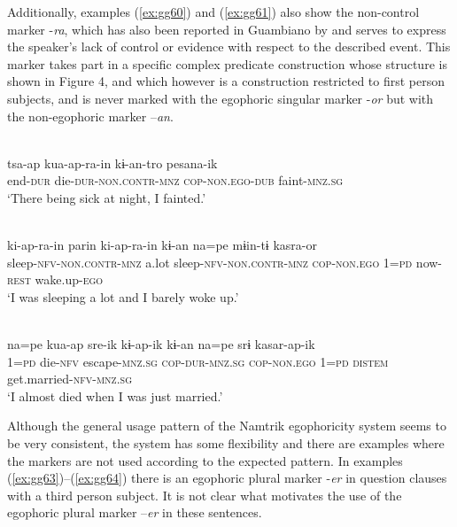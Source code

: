 \documentclass[output=paper]{langsci/langscibook}
\begin{document}
Additionally, examples (\ref{ex:gg60}) and (\ref{ex:gg61}) also show the non-control marker -\textit{ra}, which has also been reported in Guambiano by \citet[98--99]{Vasquez2017} and serves to express the speaker’s lack of control or evidence with respect to the described event. This marker takes part in a specific complex predicate construction whose structure is shown in Figure 4, %
and which however is a construction restricted to first person subjects, and is never marked with the egophoric singular marker -\textit{or} but with the non-egophoric marker –\textit{an}.


\ea \label{ex:gg60}
\\
	\gll tsa-ap	kua-ap-ra-in kɨ-an-tro	pesana-ik\\
	end-\textsc{dur} die-\textsc{dur-non.contr-mnz} \textsc{cop-non.ego-dub} faint-\textsc{mnz.sg}\\
	\glt ‘There being sick at night, I fainted.’  
\z

\ea \label{ex:gg61}
\\
	\gll ki-ap-ra-in	parin	ki-ap-ra-in	kɨ-an na=pe	mɨin-tɨ	kasra-or\\
	sleep-\textsc{nfv-non.contr-mnz} a.lot sleep-\textsc{nfv-non.contr-mnz} \textsc{cop-non.ego} 1=\textsc{pd} now-\textsc{rest} wake.up-\textsc{ego}\\
	\glt ‘‎‎I was sleeping a lot and I barely woke up.’ 
\z


\ea \label{ex:gg62}
\\
	\gll na=pe kua-ap sre-ik	kɨ-ap-ik kɨ-an na=pe srɨ kasar-ap-ik\\
	1=\textsc{pd}	 die-\textsc{nfv} escape-\textsc{mnz.sg} \textsc{cop-dur-mnz.sg} \textsc{cop-non.ego} 1=\textsc{pd} \textsc{distem}	get.married-\textsc{nfv-mnz.sg}\\
	\glt ‘I almost died when I was just married.’ 
\z


Although the general usage pattern of the Namtrik egophoricity system seems to be very consistent, the system has some flexibility and there are examples where the markers are not used according to the expected pattern. In examples (\ref{ex:gg63})--(\ref{ex:gg64}) there is an egophoric plural marker -\textit{er} in question clauses with a third person subject. It is not clear what motivates the use of the egophoric plural marker –\textit{er} in these sentences. 
\end{document}
